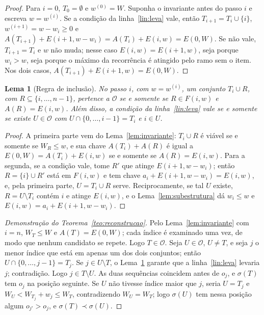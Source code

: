 \documentclass[11pt,a4paper]{article}
\theoremstyle{plain}
\newtheorem{lema}{Lema}
\theoremstyle{definition}
\theoremstyle{plain}
\begin{document}
\begin{proof}
Para $i=0$, $T_0=\emptyset$ e $w^{(0)}=W$. Suponha o invariante antes do passo $i$ e
escreva $w=w^{(i)}$. Se a condição da linha~\ref{lin:leva} vale, então
$T_{i+1}=T_i\cup\{i\}$, $w^{(i+1)}=w-w_i\ge 0$ e
$A(T_{i+1})+E(i+1,w-w_i)=A(T_i)+E(i,w)=E(0,W)$.
Se não vale, $T_{i+1}=T_i$ e $w$ não muda; nesse caso $E(i,w)=E(i+1,w)$, seja porque
$w_i>w$, seja porque o máximo da recorrência é atingido pelo ramo sem o item. Nos dois
casos, $A(T_{i+1})+E(i+1,w)=E(0,W)$.
\end{proof}

\begin{lema}[Regra de inclusão]
\label{lem:regra}
No passo $i$, com $w=w^{(i)}$, um conjunto $T_i\cup R$, com $R\subseteq\{i,\dots,n-1\}$,
pertence a $\mathcal{O}$ se e somente se $R\in F(i,w)$ e $A(R)=E(i,w)$. Além disso, a
condição da linha~\ref{lin:leva} vale se e somente se existe $U\in\mathcal{O}$ com
$U\cap\{0,\dots,i-1\}=T_i$ e $i\in U$.
\end{lema}

\begin{proof}
A primeira parte vem do Lema~\ref{lem:invariante}: $T_i\cup R$ é viável se e somente se
$W_R\le w$, e sua chave $A(T_i)+A(R)$ é igual a $E(0,W)=A(T_i)+E(i,w)$ se e somente se
$A(R)=E(i,w)$. Para a segunda, se a condição vale, tome $R'$ que atinge
$E(i+1,w-w_i)$; então $R=\{i\}\cup R'$ está em $F(i,w)$ e tem chave
$a_i+E(i+1,w-w_i)=E(i,w)$, e, pela primeira parte, $U=T_i\cup R$ serve. Reciprocamente, se tal $U$ existe,
$R=U\setminus T_i$ contém $i$ e atinge $E(i,w)$, e o Lema~\ref{lem:subestrutura} dá
$w_i\le w$ e $E(i,w)=a_i+E(i+1,w-w_i)$.
\end{proof}

\begin{proof}[Demonstração do Teorema~\ref{teo:reconstrucao}]
Pelo Lema~\ref{lem:invariante} com $i=n$, $W_T\le W$ e $A(T)=E(0,W)$; cada índice é
examinado uma vez, de modo que nenhum candidato se repete. Logo $T\in\mathcal{O}$.
Seja $U\in\mathcal{O}$, $U\ne T$, e seja $j$ o menor índice que está em apenas um dos dois
conjuntos; então $U\cap\{0,\dots,j-1\}=T_j$. Se $j\in U\setminus T$, o
Lema~\ref{lem:regra} garante que a linha~\ref{lin:leva} levaria $j$; contradição. Logo
$j\in T\setminus U$. As duas sequências coincidem antes de $o_j$, e $\sigma(T)$ tem $o_j$
na posição seguinte. Se $U$ não tivesse índice maior que $j$, seria $U=T_j$ e
$W_U<W_{T_j}+w_j\le W_T$, contradizendo $W_U=W_T$; logo $\sigma(U)$ tem nessa posição
algum $o_{j'}>o_j$, e $\sigma(T)\prec\sigma(U)$.
\end{proof}
\end{document}
